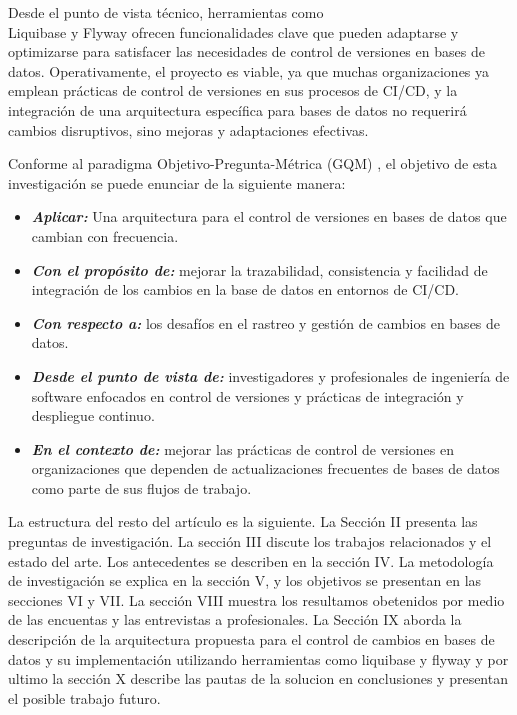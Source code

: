 \documentclass{IEEEtran}
\begin{document}
Desde el punto de vista técnico, herramientas como \\Liquibase y Flyway ofrecen funcionalidades clave que pueden adaptarse y optimizarse para satisfacer las necesidades de control de versiones en bases de datos. Operativamente, el proyecto es viable, ya que muchas organizaciones ya emplean prácticas de control de versiones en sus procesos de CI/CD, y la integración de una arquitectura específica para bases de datos no requerirá cambios disruptivos, sino mejoras y adaptaciones efectivas.

Conforme al paradigma Objetivo-Pregunta-Métrica (GQM) \cite{Basili1992}, el objetivo de esta investigación se puede enunciar de la siguiente manera:

\begin{itemize}
    \item[] {\textbf{\textit{Aplicar:}}} Una arquitectura para el control de versiones en bases de datos que cambian con frecuencia.
    \item[] {\textbf{\textit{Con el propósito de:}}} mejorar la trazabilidad, consistencia y facilidad de integración de los cambios en la base de datos en entornos de CI/CD.
    \item[] {\textbf{\textit{Con respecto a:}}} los desafíos en el rastreo y gestión de cambios en bases de datos.
    \item[] {\textbf{\textit{Desde el punto de vista de:}}} investigadores y profesionales de ingeniería de software enfocados en control de versiones y prácticas de integración y despliegue continuo.
    \item[] {\textbf{\textit{En el contexto de:}}} mejorar las prácticas de control de versiones en organizaciones que dependen de actualizaciones frecuentes de bases de datos como parte de sus flujos de trabajo.
\end{itemize}


\vspace{0.5cm}
La estructura del resto del artículo es la siguiente. La Sección II presenta las preguntas de investigación. La sección III discute los trabajos relacionados y el estado del arte. Los antecedentes se describen en la sección IV. La metodología de investigación se explica en la sección V, y los objetivos se presentan en las secciones VI y VII. La sección VIII muestra los resultamos obetenidos por medio de las encuentas y las entrevistas a profesionales. La Sección IX aborda la descripción de la arquitectura propuesta para el control de cambios en bases de datos y su implementación utilizando herramientas como liquibase y flyway y por ultimo la sección X describe las pautas de la solucion en conclusiones y presentan el posible trabajo futuro.
\end{document}
